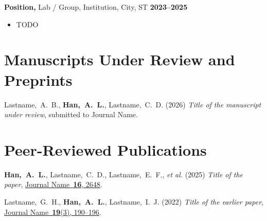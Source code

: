 \begin{resume}
{\bf Position,} Lab / Group, Institution, City, ST \hfill {\bf 2023--2025}\\
\vspace*{-.1in}
\begin{itemize}
\item[ ] TODO
\end{itemize}

\setcounter{numPubs}{3} %
\setcounter{pubCounter}{\value{numPubs}}

\section{Manuscripts Under Review and Preprints}
\secstartswithlist{}%
\begin{etaremune}[start=\value{pubCounter}]
\item
  Lastname,~A.~B.,
  {\bf Han,~A.~L.},
  Lastname,~C.~D.
  (2026)
  {\it Title of the manuscript under review},
  submitted to Journal Name.
\end{etaremune}
\setcounter{pubCounter}{\value{enumi}}\addtocounter{pubCounter}{-1}

\section{Peer-Reviewed Publications}
\secstartswithlist{}%
\begin{etaremune}[start=\value{pubCounter}]
\item
  {\bf Han,~A.~L.},
  Lastname,~C.~D.,
  Lastname,~E.~F.,
  {\it et al.}
  (2025)
  {\it Title of the paper},
  \href{https://doi.org/10.0000/example}{Journal Name~{\bf 16}, 2648}.
\item
  Lastname,~G.~H.,
  {\bf Han,~A.~L.},
  Lastname,~I.~J.
  (2022)
  {\it Title of the earlier paper},
  \href{https://doi.org/10.0000/example2}{Journal Name~{\bf 19}(3), 190--196}.
\end{etaremune}


\end{resume}
